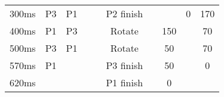 \begin{frame}
\begin{table}[]
\begin{adjustbox}{width=0.8\textwidth}
\begin{tabular}{c|cccc|c|cccc}
                \pause 300ms                            & P3                                              & P1              &                 &                 & P2 finish      &             &             & \alert{0}   & 170         \\
                \pause 400ms                            & \alert{P1}                                      & \alert{P3}      &                 &                 & \alert{Rotate} &             & 150         &             & \alert{70}  \\
                \pause 500ms                            & \alert{P3}                                      & \alert{P1}      &                 &                 & \alert{Rotate} &             & \alert{50}  &             & 70          \\
                \pause 570ms                            & P1                                              &                 &                 &                 & P3 finish      &             & 50          &             & \alert{0}   \\
                \pause 620ms                            &                                                 &                 &                 &                 & P1 finish      &             & \alert{0}   &             &
            \end{tabular}
        \end{adjustbox}
    \end{table}

\end{frame}
